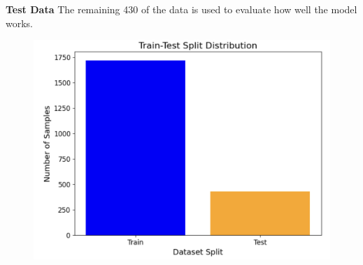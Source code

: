 \documentclass[conference]{IEEEtran} %
\begin{document}
\textbf{Test Data} The remaining 430 of the data is used to evaluate how well the model works.

\begin{figure}[ht]
    \centering
    \includegraphics[width=\linewidth]{Fig-01.pdf}
    \caption{}
    \label{fig:datasplit}
\end{figure}
\FloatBarrier
\end{document}
